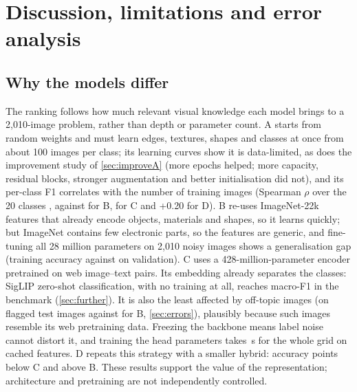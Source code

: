 \documentclass[11pt,a4paper]{article}
\begin{document}
\section{Discussion, limitations and error analysis}\label{sec:discussion}

\subsection{Why the models differ}\label{sec:why}
The ranking follows how much relevant visual knowledge each model brings to a 2,010-image problem, rather than
depth or parameter count. A starts from random weights and must learn edges, textures, shapes and classes at
once from about 100 images per class; its learning curves show it is data-limited, as does the improvement study of
\cref{sec:improveA} (more epochs helped; more capacity, residual blocks, stronger augmentation and better
initialisation did not), and its per-class F1 correlates with the number of training images (Spearman $\rho$ over
the 20 classes \rhoA, against \rhoB for B, \rhoC for C and +0.20 for D). B re-uses ImageNet-22k features that already encode objects, materials and shapes, so it learns quickly;
but ImageNet contains few electronic parts, so the features are generic, and fine-tuning all 28 million parameters on
2,010 noisy images shows a generalisation gap (training accuracy \finalTrainAccB against \valAccB on validation). C uses a
428-million-parameter encoder pretrained on web image--text pairs. Its embedding already separates the classes:
SigLIP zero-shot classification, with no training at all, reaches macro-F1 \bmZeroSiglip in the benchmark
(\cref{sec:further}). It is also the least affected by off-topic images (\accOODC on flagged test images against
\accOODB for B, \cref{sec:errors}), plausibly because such images resemble its web pretraining data. Freezing the
backbone means label noise cannot distort it, and
training the \paramsHead head parameters takes \timeC\,s for the whole grid on cached features.
D repeats this strategy with a smaller hybrid: \diffCD{} accuracy points below C and \diffDB{} above B.
These results support the value of the representation; architecture and pretraining are not independently controlled.
\end{document}
